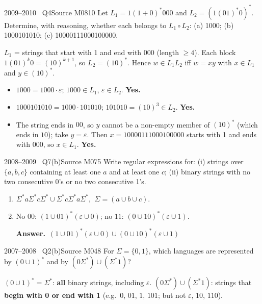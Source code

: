 \documentclass[11pt,a4paper]{article}
\newcommand{\eps}{\varepsilon}
\newcommand{\ans}[1]{\par\smallskip\noindent\colorbox{mist}{\parbox{\dimexpr\linewidth-2\fboxsep}{\sffamily\small\textbf{\color{teal}Answer.}\ \color{ink}#1}}\par}
\begin{document}
\begin{question}{2009--2010 \textbullet\ Q4}{Source M08}{10}
Let $L_1=1(1+0)^*000$ and $L_2=(1(01)^*0)^*$. Determine, with reasoning, whether each belongs to $L_1\circ L_2$: (a) 1000; (b) 1000101010; (c) 10000111000100000.
\end{question}
\begin{solution}
$L_1$ = strings that start with 1 and end with 000 (length $\ge4$). Each block $1(01)^k0=(10)^{k+1}$, so $L_2=(10)^*$. Hence $w\in L_1L_2$ iff $w=xy$ with $x\in L_1$ and $y\in(10)^*$.
\begin{itemize}
\item[(a)] $1000=1000\cdot\eps$; $1000\in L_1$, $\eps\in L_2$. \textbf{Yes.}
\item[(b)] $1000101010=1000\cdot101010$; $101010=(10)^3\in L_2$. \textbf{Yes.}
\item[(c)] The string ends in $00$, so $y$ cannot be a non-empty member of $(10)^*$ (which ends in $10$); take $y=\eps$. Then $x=10000111000100000$ starts with 1 and ends with 000, so $x\in L_1$. \textbf{Yes.}
\end{itemize}
\end{solution}

\begin{question}{2008--2009 \textbullet\ Q7(b)}{Source M07}{5}
Write regular expressions for: (i) strings over $\{a,b,c\}$ containing at least one $a$ and at least one $c$; (ii) binary strings with no two consecutive 0's or no two consecutive 1's.
\end{question}
\begin{solution}
\begin{enumerate}
\item $\Sigma^*a\Sigma^*c\Sigma^*\cup\Sigma^*c\Sigma^*a\Sigma^*$, $\ \Sigma=(a\cup b\cup c)$.
\item No $00$: $(1\cup01)^*(\eps\cup0)$; no $11$: $(0\cup10)^*(\eps\cup1)$. \ans{$(1\cup01)^*(\eps\cup0)\cup(0\cup10)^*(\eps\cup1)$}
\end{enumerate}
\end{solution}

\begin{question}{2007--2008 \textbullet\ Q2(b)}{Source M04}{8}
For $\Sigma=\{0,1\}$, which languages are represented by $(0\cup1)^*$ and by $(0\Sigma^*)\cup(\Sigma^*1)$?
\end{question}
\begin{solution}
$(0\cup1)^*=\Sigma^*$: \textbf{all} binary strings, including $\eps$.
$(0\Sigma^*)\cup(\Sigma^*1)$: strings that \textbf{begin with 0 or end with 1} (e.g.\ $0$, $01$, $1$, $101$; but not $\eps$, $10$, $110$).
\end{solution}
\end{document}
